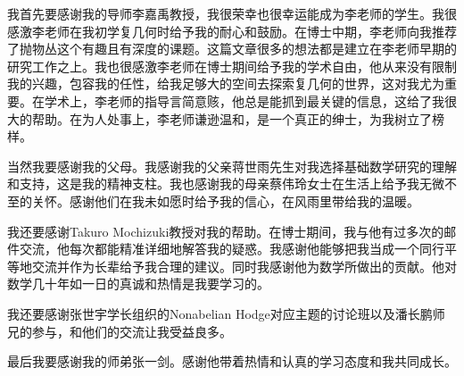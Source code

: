 
\begin{acknowledgements}

我首先要感谢我的导师李嘉禹教授，我很荣幸也很幸运能成为李老师的学生。我很感激李老师在我初学复几何时给予我的耐心和鼓励。在博士中期，李老师向我推荐了抛物丛这个有趣且有深度的课题。这篇文章很多的想法都是建立在李老师早期的研究工作之上。我也很感激李老师在博士期间给予我的学术自由，他从来没有限制我的兴趣，包容我的任性，给我足够大的空间去探索复几何的世界，这对我尤为重要。在学术上，李老师的指导言简意赅，他总是能抓到最关键的信息，这给了我很大的帮助。在为人处事上，李老师谦逊温和，是一个真正的绅士，为我树立了榜样。

当然我要感谢我的父母。我感谢我的父亲蒋世雨先生对我选择基础数学研究的理解和支持，这是我的精神支柱。我也感谢我的母亲蔡伟玲女士在生活上给予我无微不至的关怀。感谢他们在我未如愿时给予我的信心，在风雨里带给我的温暖。

我还要感谢Takuro Mochizuki教授对我的帮助。在博士期间，我与他有过多次的邮件交流，他每次都能精准详细地解答我的疑惑。我感谢他能够把我当成一个同行平等地交流并作为长辈给予我合理的建议。同时我感谢他为数学所做出的贡献。他对数学几十年如一日的真诚和热情是我要学习的。

我还要感谢张世宇学长组织的Nonabelian Hodge对应主题的讨论班以及潘长鹏师兄的参与，和他们的交流让我受益良多。

最后我要感谢我的师弟张一剑。感谢他带着热情和认真的学习态度和我共同成长。
\end{acknowledgements}
